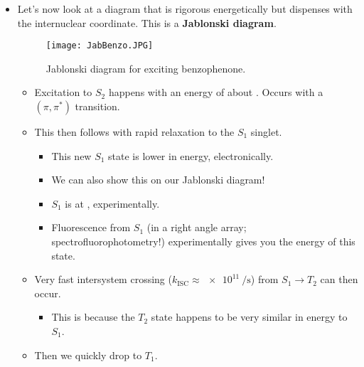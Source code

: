 \documentclass[../notes.tex]{subfiles}
\begin{document}
\begin{itemize}
\begin{itemize}
\begin{itemize}
            \item Here, $\varepsilon>10^4$.
            \item Thus, we'll preferentially excite this transition.
            \item The $\lambda_\text{max}$ for this transition is known; we can look up the exact value, but it's about \SI{315}{\nano\meter}.
            \item In effect, the result is an $S_2$ state because we've excited up two energy levels.
        \end{itemize}
    \end{itemize}
    \item Let's now look at a diagram that is rigorous energetically but dispenses with the internuclear coordinate. This is a \textbf{Jablonski diagram}.
    \begin{figure}[H]
        \centering
        \texttt{[image: JabBenzo.JPG]}
        \caption{Jablonski diagram for exciting benzophenone.}
        \label{fig:JabBenzo}
    \end{figure}
    \begin{itemize}
        \item Excitation to $S_2$ happens with an energy of about . Occurs with a $(\pi,\pi^*)$ transition.
        \item This then follows with rapid relaxation to the $S_1$ singlet.
        \begin{itemize}
            \item This new $S_1$ state is lower in energy, electronically.
            \item We can also show this on our Jablonski diagram!
            \item $S_1$ is at , experimentally.
            \item Fluorescence from $S_1$ (in a right angle array; spectrofluorophotometry!) experimentally gives you the energy of this state.
        \end{itemize}
        \item Very fast intersystem crossing ($k_\text{ISC}\approx\SI{e11}{\per\second}$) from $S_1\to T_2$ can then occur.
        \begin{itemize}
            \item This is because the $T_2$ state happens to be very similar in energy to $S_1$.
        \end{itemize}
        \item Then we quickly drop to $T_1$.
        \begin{itemize}

\end{itemize}
\end{itemize}
\end{itemize}
\end{document}
